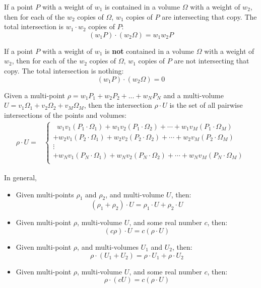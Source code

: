 \documentclass{book}
\begin{document}
If a point \(P\) with a weight of \(w_1\) is contained in a volume \(\Omega\) with a weight of \(w_2\), then for each of the \(w_2\) copies of \(\Omega\), \(w_1\) copies of \(P\) are intersecting that copy. The total intersection is \(w_1 \cdot w_2\) copies of \(P\):
\[(w_1 P) \cdot (w_2\Omega) = w_1w_2P\]      

If a point \(P\) with a weight of \(w_1\) is {\bf not} contained in a volume \(\Omega\) with a weight of \(w_2\), then for each of the \(w_2\) copies of \(\Omega\), \(w_1\) copies of \(P\) are not intersecting that copy. The total intersection is nothing:
\[(w_1 P) \cdot (w_2\Omega) = 0\]      

Given a multi-point \(\rho = w_1 P_1 + w_2 P_2 + ... + w_N P_N\) and a multi-volume \\ \(U = v_1\Omega_1 + v_2\Omega_2 + v_M\Omega_M\), then the intersection \(\rho \cdot U\) is the set of all pairwise intersections of the points and volumes:
\begin{align*}
\rho \cdot U = & \left\{\begin{array}{c}
\;\; w_1 v_1 (P_1 \cdot \Omega_1) + w_1 v_2 (P_1 \cdot \Omega_2) + \cdots + w_1 v_M (P_1 \cdot \Omega_M) \\ 
+ w_2 v_1 (P_2 \cdot \Omega_1) + w_2 v_2 (P_2 \cdot \Omega_2) + \cdots + w_2 v_M (P_2 \cdot \Omega_M) \\ 
\vdots \\
+ w_N v_1 (P_N \cdot \Omega_1) + w_N v_2 (P_N \cdot \Omega_2) + \cdots + w_N v_M (P_N \cdot \Omega_M) \\ 
\end{array}\right.
\end{align*}

In general,
\begin{itemize}
\item Given multi-points \(\rho_1\) and \(\rho_2\), and multi-volume \(U\), then:
\[(\rho_1 + \rho_2) \cdot U = \rho_1 \cdot U + \rho_2 \cdot U\] 
\item Given multi-point \(\rho\), multi-volume \(U\), and some real number \(c\), then:
\[(c\rho) \cdot U = c(\rho \cdot U)\]
\item Given multi-point \(\rho\), and multi-volumes \(U_1\) and \(U_2\), then:
\[\rho \cdot (U_1 + U_2) = \rho \cdot U_1 + \rho \cdot U_2\] 
\item Given multi-point \(\rho\), multi-volume \(U\), and some real number \(c\), then:
\[\rho \cdot (cU) = c(\rho \cdot U)\]
\end{itemize}
\end{document}
